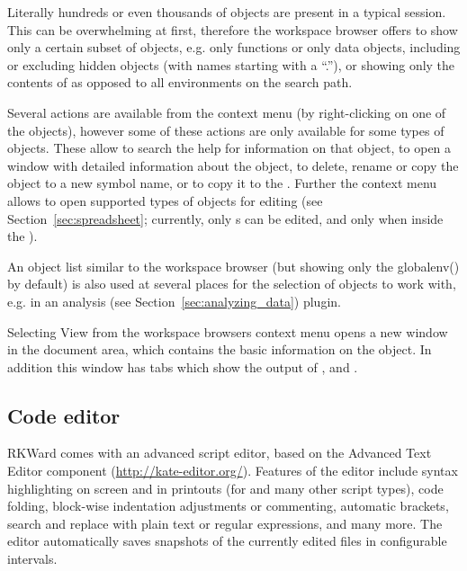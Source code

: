 Literally hundreds or even thousands of objects are present in a typical
 session. This can be overwhelming at
first, therefore the workspace browser offers to show only a certain
subset of objects, e.g. only functions or only data objects, including
or excluding hidden objects (with names
starting with a 
``.''), or showing only the contents of  as
opposed to all environments on the search path.

Several actions are available from the context menu (by right-clicking
on one of the objects), however some of these actions are only
available for some types of objects. These allow to search the
 help for information on that object, to
open a window with detailed information about the object, to delete, rename or copy the object to a new symbol name, or to
copy it to the . Further the context menu allows to open
supported types of objects for editing (see Section~\ref{sec:spreadsheet}; currently, only
s can be edited, and only when inside the ). 

An object list similar to the workspace browser (but showing only the
globalenv() by default) is also used at several places for the
selection of objects to work with, e.g. in an analysis (see Section~\ref{sec:analyzing_data})
plugin.

Selecting View from the workspace
browsers context menu opens a new window in the
document area, which contains the basic information on the object. In
addition this window has tabs which show the output of
, and .

\subsection{Code editor}
\label{sec:code_editor}

RKWard comes with an advanced
 script editor, based on the
 Advanced Text Editor component
(\url{http://kate-editor.org/}). Features of the
editor include syntax highlighting on screen and in printouts (for
 and many other script types), code
folding, block-wise indentation adjustments or commenting, automatic
brackets, search and replace with plain text or regular expressions,
and many more. The editor automatically saves snapshots of the
currently edited files in configurable intervals.

